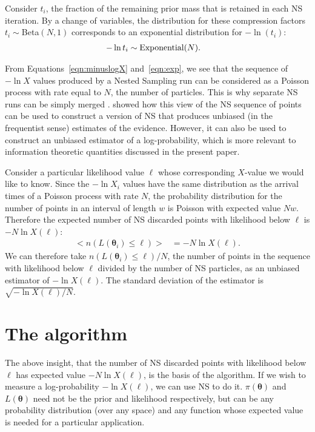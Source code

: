 \documentclass[entropy,article,accept,oneauthor,pdftex,10pt,a4paper]{mdpi}
\newcommand{\x}{\boldsymbol{\theta}}
\begin{document}
Consider $t_i$, the fraction of the remaining prior mass that is retained
in each NS iteration. By a change of variables,
the distribution for these compression factors $t_i \sim $Beta$(N,1)$
corresponds to an exponential distribution for $-\ln(t_i)$:
\begin{align}
-\ln t_i &\sim \textnormal{Exponential}(N).\label{eqn:exp}
\end{align}

From Equations~\ref{eqn:minuslogX} and~\ref{eqn:exp}, we see that
the sequence of $-\ln X$ values produced by a Nested Sampling run can be
considered as a Poisson process with rate equal to $N$, the number of
particles. This is why separate NS runs can be simply merged
\citep{skilling2006nested}.
\citet{Walter2015} showed how this view of the NS sequence of points
can be used to construct a
version of NS that produces unbiased (in the frequentist sense)
estimates of the evidence.
However, it can also be used to construct an unbiased estimator of
a log-probability, which is more relevant to information theoretic
quantities discussed in the present paper.

Consider a particular likelihood value $\ell$ whose corresponding $X$-value
we would like to know. Since the $-\ln X_i$ values have the same distribution
as the arrival times of a Poisson process with rate $N$, the probability
distribution for the number of points in an interval of length $w$ is
Poisson with expected value $Nw$. Therefore the expected number of
NS discarded points with likelihood below $\ell$ is $-N\ln X(\ell)$:
\begin{align}
\big< n(L(\x_i) \leq \ell) \big> &= -N\ln X(\ell).
\end{align}
We can therefore take $n(L(\x_i) \leq \ell)/N$, the number of points in the
sequence with likelihood below $\ell$ divided by the number of NS particles,
as an unbiased estimator of $-\ln X(\ell)$. The standard deviation of the
estimator is $\sqrt{-\ln X(\ell)/N}$.

\section{The algorithm}

The above insight, that the number of NS discarded points with likelihood
below $\ell$ has expected value $-N\ln X(\ell)$, is the basis of the algorithm.
If we wish to measure a log-probability $-\ln X(\ell)$, we can use NS to do it.
$\pi(\x)$ and $L(\x)$ need not be the prior and likelihood respectively, but
can be any probability distribution (over any space) and any function whose
expected value is needed for a particular application.
\end{document}

